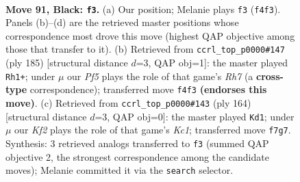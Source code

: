 \documentclass[11pt]{article}
\begin{document}
\clearpage

\begin{figure}[p]\centering
\begin{subfigure}{0.46\textwidth}\centering
\resizebox{\linewidth}{!}{%
\newchessgame
\chessboard[
  setfen={2R5/5k2/8/8/5p2/7K/8/3r4 b - - 1 91},
  showmover=false,
  pgfstyle=straightmove, color=movearrow, markmove={f4-f3}
]}
\caption{}
\end{subfigure}\hfill
\begin{subfigure}{0.46\textwidth}\centering
\resizebox{\linewidth}{!}{%
\newchessgame
\chessboard[
  setfen={1k6/8/8/8/8/2R5/7r/3K4 b - - 17 93},
  showmover=false,
  pgfstyle=straightmove, color=movearrow, markmove={h2-h1}
]}
\caption{}
\end{subfigure}
\\[4pt]
\begin{subfigure}{0.46\textwidth}\centering
\resizebox{\linewidth}{!}{%
\newchessgame
\chessboard[
  setfen={1k6/6r1/8/8/8/7R/8/2K5 w - - 35 83},
  showmover=false,
  pgfstyle=straightmove, color=movearrow, markmove={c1-d1}
]}
\caption{}
\end{subfigure}\hfill

\caption{\textbf{Move 91, Black: \texttt{f3}.} (a) Our position; Melanie plays \texttt{f3} (\texttt{f4f3}). Panels (b)--(d) are the retrieved master positions whose correspondence most drove this move (highest QAP objective among those that transfer to it). (b) Retrieved from \texttt{ccrl\_top\_p0000\#147} (ply 185) [structural distance $d$=3, QAP obj=1]: the master played \texttt{Rh1+}; under $\mu$ our \emph{Pf5} plays the role of that game's \emph{Rh7} (a \textbf{cross-type} correspondence); transferred move \texttt{f4f3} \textbf{(endorses this move)}. (c) Retrieved from \texttt{ccrl\_top\_p0000\#143} (ply 164) [structural distance $d$=3, QAP obj=0]: the master played \texttt{Kd1}; under $\mu$ our \emph{Kf2} plays the role of that game's \emph{Kc1}; transferred move \texttt{f7g7}. Synthesis: 3 retrieved analogs transferred to \texttt{f3} (summed QAP objective 2, the strongest correspondence among the candidate moves); Melanie committed it via the \texttt{search} selector.}
\label{fig:thought-m181}
\end{figure}

\clearpage
\end{document}
